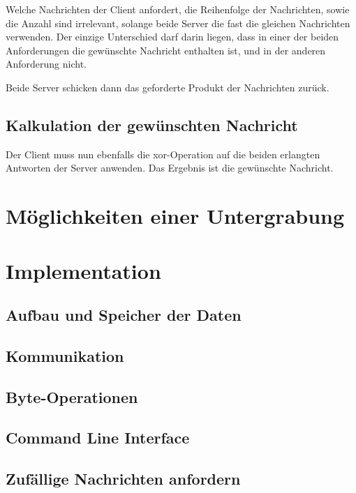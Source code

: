 \documentclass[]{article}
\begin{document}
Welche Nachrichten der Client anfordert, die Reihenfolge der Nachrichten, sowie die Anzahl sind irrelevant, solange beide Server die fast die gleichen Nachrichten verwenden. Der einzige Unterschied darf darin liegen, dass in einer der beiden Anforderungen die gewünschte Nachricht enthalten ist, und in der anderen Anforderung nicht.

Beide Server schicken dann das geforderte Produkt der Nachrichten zurück.

\subsection{Kalkulation der gewünschten Nachricht}
Der Client muss nun ebenfalls die xor-Operation auf die beiden erlangten Antworten der Server anwenden. Das Ergebnis ist die gewünschte Nachricht.

\section{Möglichkeiten einer Untergrabung}

\section{Implementation}
\subsection{Aufbau und Speicher der Daten}
\subsection{Kommunikation}
\subsection{Byte-Operationen}
\subsection{Command Line Interface}
\subsection{Zufällige Nachrichten anfordern}
\end{document}
